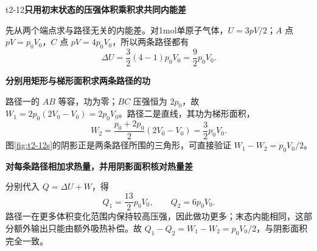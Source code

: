 \begin{drillsolution}{t2-12}\textbf{只用初末状态的压强体积乘积求共同内能差}\par\nobreak
先从两个端点求与路径无关的内能差。对1mol单原子气体，$U=3pV/2$；$A$ 点 $pV=p_0V_0$，$C$ 点 $pV=4p_0V_0$，所以两条路径都有
\[\boxed{\Delta U=\frac32(4-1)p_0V_0=\frac92p_0V_0}.\]


\par\medskip{}\noindent\textbf{分别用矩形与梯形面积求两条路径的功}\par\nobreak
路径一的 $AB$ 等容，功为零；$BC$ 压强恒为 $2p_0$，故 $W_1=2p_0(2V_0-V_0)=2p_0V_0$。路径二是直线，其功为梯形面积，
\[W_2=\frac{p_0+2p_0}{2}(2V_0-V_0)=\frac32p_0V_0.\]
图\ref{fig:t2-12s}的阴影正是两条路径所围的三角形，可直接验证 $W_1-W_2=p_0V_0/2$。



\par\medskip{}\noindent\textbf{对每条路径相加求热量，并用阴影面积核对热量差}\par\nobreak
分别代入 $Q=\Delta U+W$，得
\[\boxed{Q_1=\frac{13}{2}p_0V_0,\qquad Q_2=6p_0V_0}.\]
路径一在更多体积变化范围内保持较高压强，因此做功更多；末态内能相同，这部分额外输出只能由额外吸热补偿。故 $Q_1-Q_2=W_1-W_2=p_0V_0/2$，与阴影面积完全一致。
\end{drillsolution}
